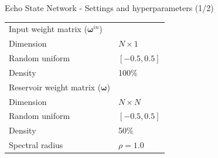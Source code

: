 \documentclass[aspectratio=169]{beamer}
\begin{document}
\begin{frame}[t]{Echo State Network  - Settings and hyperparameters (1/2)}
\begin{minipage}[t]{0.7\textwidth}
\begin{table}[ht]
\begin{tabular}{ll}
				\midrule
				Input weight matrix ($\boldsymbol{\omega}^{in}$)    &                                      \\
				\hspace{2.5mm} Dimension                            & $N \times 1$                         \\
				\hspace{2.5mm} Random uniform                       & $[-0.5, 0.5]$                        \\
				\hspace{2.5mm} Density                              & 100\%                                \\
				\midrule
				Reservoir weight matrix ($\boldsymbol{\omega}$)     &                                      \\
				\hspace{2.5mm} Dimension                            & $N \times N$                         \\
				\hspace{2.5mm} Random uniform                       & $[-0.5, 0.5]$                        \\
				\hspace{2.5mm} Density                              & 50\%                                 \\
				\hspace{2.5mm} Spectral radius                      & $\rho = 1.0$                         \\
				\bottomrule
				\end{tabular}
			\end{table}
    \end{minipage}
\end{frame}
\end{document}
